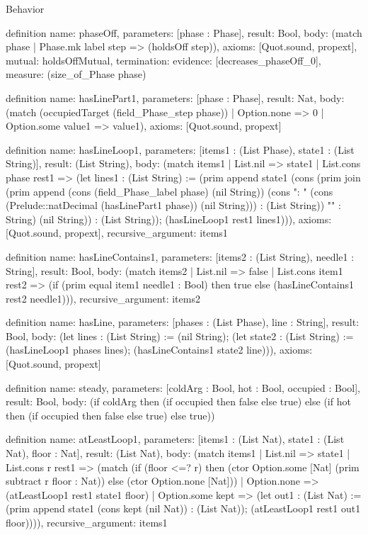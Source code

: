 \begin{lexlean}{Behavior}
\begin{semanticmodule}
definition{
  name: phaseOff,
  parameters: [phase : Phase],
  result: Bool,
  body: (match phase | Phase.mk label step => (holdsOff step)),
  axioms: [Quot.sound, propext],
  mutual: holdsOffMutual,
  termination: {evidence: [decreases_phaseOff_0], measure: (size_of_Phase phase)}
}

definition{
  name: hasLinePart1,
  parameters: [phase : Phase],
  result: Nat,
  body: (match (occupiedTarget (field_Phase_step phase))
    | Option.none => 0
    | Option.some value1 => value1),
  axioms: [Quot.sound, propext]
}

definition{
  name: hasLineLoop1,
  parameters: [items1 : (List Phase), state1 : (List String)],
  result: (List String),
  body: (match items1
    | List.nil => state1
    | List.cons phase rest1 => (let lines1 : (List String) := (prim append state1 (cons (prim join (prim append (cons (field_Phase_label phase) (nil String)) (cons ": " (cons (Prelude::natDecimal (hasLinePart1 phase)) (nil String))) : (List String)) "" : String) (nil String)) : (List String)); (hasLineLoop1 rest1 lines1))),
  axioms: [Quot.sound, propext],
  recursive_argument: items1
}

definition{
  name: hasLineContains1,
  parameters: [items2 : (List String), needle1 : String],
  result: Bool,
  body: (match items2
    | List.nil => false
    | List.cons item1 rest2 => (if (prim equal item1 needle1 : Bool) then true else (hasLineContains1 rest2 needle1))),
  recursive_argument: items2
}

definition{
  name: hasLine,
  parameters: [phases : (List Phase), line : String],
  result: Bool,
  body: (let lines : (List String) := (nil String); (let state2 : (List String) := (hasLineLoop1 phases lines); (hasLineContains1 state2 line))),
  axioms: [Quot.sound, propext]
}

definition{
  name: steady,
  parameters: [coldArg : Bool, hot : Bool, occupied : Bool],
  result: Bool,
  body: (if coldArg then (if occupied then false else true) else (if hot then (if occupied then false else true) else true))
}

definition{
  name: atLeastLoop1,
  parameters: [items1 : (List Nat), state1 : (List Nat), floor : Nat],
  result: (List Nat),
  body: (match items1
    | List.nil => state1
    | List.cons r rest1 => (match (if (floor <=? r) then (ctor Option.some [Nat] (prim subtract r floor : Nat)) else (ctor Option.none [Nat]))
      | Option.none => (atLeastLoop1 rest1 state1 floor)
      | Option.some kept => (let out1 : (List Nat) := (prim append state1 (cons kept (nil Nat)) : (List Nat)); (atLeastLoop1 rest1 out1 floor)))),
  recursive_argument: items1
}


\end{semanticmodule}
\end{lexlean}

